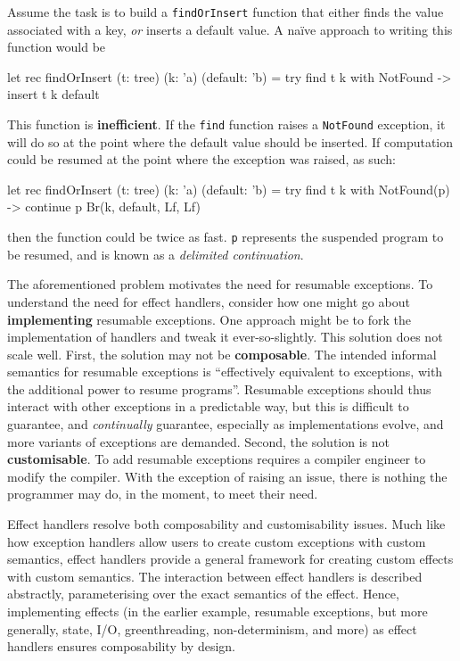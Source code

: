 Assume the task is to build a \texttt{findOrInsert} function that either finds the value associated with a key, \textit{or} inserts a default value. A naïve approach to writing this function would be
\begin{ocaml}  
let rec findOrInsert (t: tree) (k: 'a) (default: 'b) = 
  try find t k with NotFound -> insert t k default
\end{ocaml}
This function is \textbf{inefficient}. If the \texttt{find} function raises a \texttt{NotFound} exception, it will do so at the point where the default value should be inserted. If computation could be resumed at the point where the exception was raised, as such:
\begin{ocaml}
let rec findOrInsert (t: tree) (k: 'a) (default: 'b) = 
  try find t k with NotFound(p) -> continue p Br(k, default, Lf, Lf)
\end{ocaml}
then the function could be twice as fast. \texttt{p} represents the suspended program to be resumed, and is known as a \textit{delimited continuation}.

The aforementioned problem motivates the need for resumable exceptions. To understand the need for effect handlers, consider how one might go about \textbf{implementing} resumable exceptions. One approach might be to fork the implementation of handlers and tweak it ever-so-slightly. This solution does not scale well. First, the solution may not be \textbf{composable}. The intended informal semantics for resumable exceptions is ``effectively equivalent to exceptions, with the additional power to resume programs''. Resumable exceptions should thus interact with other exceptions in a predictable way, but this is difficult to guarantee, and \textit{continually} guarantee, especially as implementations evolve, and more variants of exceptions are demanded. Second, the solution is not \textbf{customisable}. To add resumable exceptions requires a compiler engineer to modify the compiler. With the exception of raising an issue, there is nothing the programmer may do, in the moment, to meet their need.

Effect handlers resolve both composability and customisability issues. Much like how exception handlers allow users to create custom exceptions with custom semantics, effect handlers provide a general framework for creating custom effects with custom semantics. The interaction between effect handlers is described abstractly, parameterising over the exact semantics of the effect. Hence, implementing effects (in the earlier example, resumable exceptions, but more generally, state, I/O, greenthreading, non-determinism, and more) as effect handlers ensures composability by design. 

